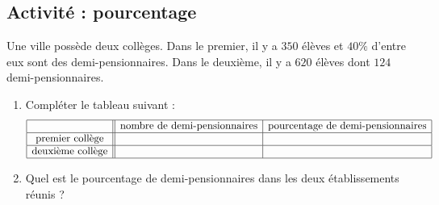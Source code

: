 
\subsection*{Activité : pourcentage}

Une ville possède deux collèges. Dans le premier, il y a $350$ élèves et $40\%$ d'entre eux sont des demi-pensionnaires.  Dans le deuxième, il y a $620$ élèves dont $124$ demi-pensionnaires.  
\begin{enumerate}
    \item
        Compléter le tableau suivant :
        \begin{equation*}
            \begin{array}[]{|c||c|c|}
                \hline
                &\text{nombre de demi-pensionnaires}&\text{pourcentage de demi-pensionnaires}\\
                \hline
                \text{premier collège}&&\\
                \hline
                \text{deuxième collège}&&\\
                \hline
            \end{array}
        \end{equation*}
\item
Quel est le pourcentage de demi-pensionnaires dans les deux établissements réunis ?
\end{enumerate}
